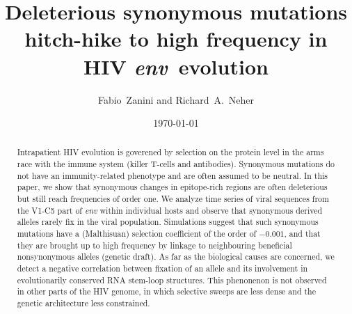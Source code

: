 \documentclass[rmp, twocolumn]{revtex4}
\newcommand{\Author}{Fabio~Zanini and Richard~A.~Neher}
\newcommand{\Title}{Deleterious synonymous mutations hitch-hike to high frequency in HIV \env~evolution}
\newcommand{\env}{\textit{env}}
\begin{document}
\title{\Title}
\author{\Author}
\date{\today}

\begin{abstract}
\noindent
Intrapatient HIV evolution is goverened by selection on the protein level in the
arms race with the immune system (killer T-cells and antibodies). Synonymous
mutations do not have an immunity-related phenotype and are often assumed to be
neutral. In this paper, we show that synonymous changes in epitope-rich regions
are often deleterious but still reach frequencies of order one.  We analyze time
series of viral sequences from the V1-C5 part of {\it env} within individual
hosts and observe that synonymous derived alleles rarely fix in the
viral population. Simulations suggest that such synonymous mutations
have a (Malthisuan) selection coefficient of the order of $-0.001$, and that
they are brought up to high frequency by linkage to neighbouring beneficial
nonsynonymous alleles (genetic draft). As far as the biological causes are
concerned, we detect a negative correlation between fixation of an allele and
its involvement in evolutionarily conserved RNA stem-loop structures.
This phenonenon is not observed in other parts of the HIV genome, in which
selective sweeps are less dense and the genetic architecture less constrained.
\end{abstract}
\end{document}
